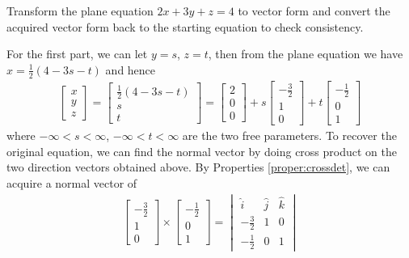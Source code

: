 \begin{exmp}
Transform the plane equation $2x+3y+z = 4$ to vector form and convert the acquired vector form back to the starting equation to check consistency.
\end{exmp}
\begin{solution}
For the first part, we can let $y=s$, $z=t$, then from the plane equation we have $x = \frac{1}{2}(4-3s-t)$ and hence
\begin{align*}
\begin{bmatrix}
x \\
y \\
z
\end{bmatrix}
=
\begin{bmatrix}
\frac{1}{2}(4-3s-t) \\
s \\
t
\end{bmatrix}
=
\begin{bmatrix}
2 \\
0 \\
0
\end{bmatrix}
+ s
\begin{bmatrix}
-\frac{3}{2} \\
1 \\
0
\end{bmatrix}
+ t
\begin{bmatrix}
-\frac{1}{2} \\
0 \\
1
\end{bmatrix}
\end{align*}
where $-\infty < s < \infty$, $-\infty < t < \infty$ are the two free parameters. To recover the original equation, we can find the normal vector by doing cross product on the two direction vectors obtained above. By Properties \ref{proper:crossdet}, we can acquire a normal vector of
\begin{align*}
\begin{bmatrix}
-\frac{3}{2} \\
1 \\
0
\end{bmatrix}
\times
\begin{bmatrix}
-\frac{1}{2} \\
0 \\
1
\end{bmatrix}
=
\begin{vmatrix}
\hat{i} & \hat{j} & \hat{k} \\
-\frac{3}{2} & 1 & 0 \\
-\frac{1}{2} & 0 & 1
\end{vmatrix}

\end{align*}
\end{solution}
